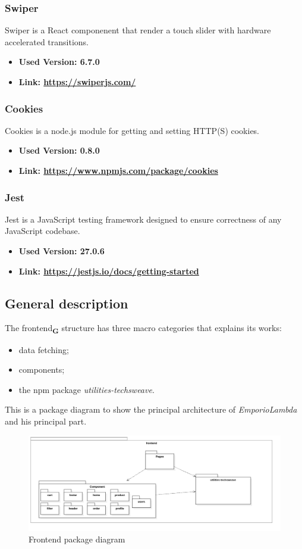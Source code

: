\subsubsection{Swiper}
Swiper is a React componenent that render a touch slider with hardware accelerated transitions.
\begin{itemize}
  \item \textbf{Used Version: 6.7.0}
  \item \textbf{Link: \url{https://swiperjs.com/}}
\end{itemize}
\subsubsection{Cookies}
Cookies is a node.js module for getting and setting HTTP(S) cookies.
\begin{itemize}
  \item \textbf{Used Version: 0.8.0}
  \item \textbf{Link: \url{https://www.npmjs.com/package/cookies}}
\end{itemize}
\subsubsection{Jest}
Jest is a JavaScript testing framework designed to ensure correctness of any JavaScript codebase.
\begin{itemize}
  \item \textbf{Used Version: 27.0.6}
  \item \textbf{Link: \url{https://jestjs.io/docs/getting-started}}
\end{itemize}

\subsection{General description}
The frontend\textsubscript{\textbf{G}} structure has three macro categories that explains its works:
\begin{itemize}
  \item data fetching;
  \item components;
  \item the npm package \textit{utilities-techsweave}.
\end{itemize}

This is a package diagram to show the principal architecture of \textit{EmporioLambda} and his principal part.
\begin{figure}[!ht]
  \caption{Frontend package diagram}
  \vspace{10px}
  \includegraphics[scale=0.39]{../../../../Images/Diagrammi/maintainerManual/FE/FEgraph.png}
  \centering
\end{figure}

